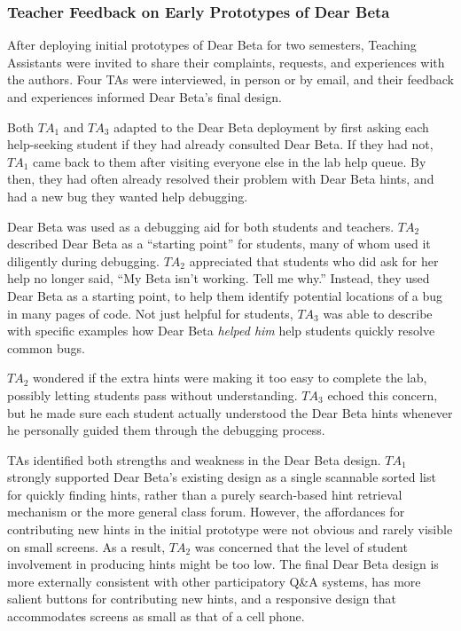 \subsubsection{Teacher Feedback on Early Prototypes of Dear Beta}


After deploying initial prototypes of Dear Beta for two semesters, Teaching Assistants were invited to share their complaints, requests, and experiences with the authors. Four TAs were interviewed, in person or by email, and their feedback and experiences informed Dear Beta's final design.

Both $TA_{1}$ and $TA_{3}$ adapted to the Dear Beta deployment by first asking each help-seeking student if they had already consulted Dear Beta. If they had not, $TA_{1}$ came back to them after visiting everyone else in the lab help queue. By then, they had often already resolved their problem with Dear Beta hints, and had a new bug they wanted help debugging. 

Dear Beta was used as a debugging aid for both students and teachers. $TA_{2}$ described Dear Beta as a ``starting point'' for students, many of whom used it diligently during debugging. $TA_{2}$ appreciated that students who did ask for her help no longer said, ``My Beta isn't working. Tell me why.'' Instead, they used Dear Beta as a starting point, to help them identify potential locations of a bug in many pages of code. Not just helpful for students, $TA_{3}$ was able to describe with specific examples how Dear Beta \textit{helped him} help students quickly resolve common bugs.

$TA_{2}$ wondered if the extra hints were making it too easy to complete the lab, possibly letting students pass without understanding. $TA_{3}$ echoed this concern, but he made sure each student actually understood the Dear Beta hints whenever he personally guided them through the debugging process.

TAs identified both strengths and weakness in the Dear Beta design. $TA_{1}$ strongly supported Dear Beta's existing design as a single scannable sorted list for quickly finding hints, rather than a purely search-based hint retrieval mechanism or the more general class forum. However, the affordances for contributing new hints in the initial prototype were not obvious and rarely visible on small screens. As a result, $TA_{2}$ was concerned that the level of student involvement in producing hints might be too low. The final Dear Beta design is more externally consistent with other participatory Q\&A systems, has more salient buttons for contributing new hints, and a responsive design that accommodates screens as small as that of a cell phone. 

